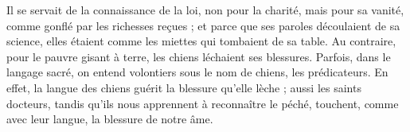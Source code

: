 Il se servait de la connaissance de la loi, non pour la charité, mais pour sa vanité, comme gonflé par les richesses reçues ; et parce que ses paroles découlaient de sa science, elles étaient comme les miettes qui tombaient de sa table. Au contraire, pour le pauvre gisant à terre, les chiens léchaient ses blessures. Parfois, dans le langage sacré, on entend volontiers sous le nom de chiens, les prédicateurs. En effet, la langue des chiens guérit la blessure qu’elle lèche ; aussi les saints docteurs, tandis qu’ils nous apprennent à reconnaître le péché, touchent, comme avec leur langue, la blessure de notre âme.
